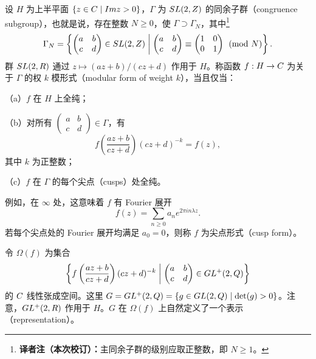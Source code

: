 设 $H$ 为上半平面 $\{z\in C\mid Imz>0\}$，$\Gamma$ 为 $SL(2,Z)$ 的同余子群（congruence subgroup），也就是说，存在整数 $N\geq0$，使 $\Gamma\supset\Gamma_N$，其中\footnote{\textbf{译者注（本次校订）：}主同余子群的级别应取正整数，即 $N\geq1$。}
\[
\Gamma_N=\left\{\begin{pmatrix}a&b\\c&d\end{pmatrix}\in SL(2,Z)\;\middle|\;
\begin{pmatrix}a&b\\c&d\end{pmatrix}\equiv\begin{pmatrix}1&0\\0&1\end{pmatrix}\pmod N\right\}.
\]
群 $SL(2,R)$ 通过 $z\mapsto(az+b)/(cz+d)$ 作用于 $H$。称函数 $f:H\to C$ 为关于 $\Gamma$ 的权 $k$ 模形式（modular form of weight $k$），当且仅当：

（a）$f$ 在 $H$ 上全纯；

（b）对所有 $\begin{pmatrix}a&b\\c&d\end{pmatrix}\in\Gamma$，有
\[
f\left(\frac{az+b}{cz+d}\right)(cz+d)^{-k}=f(z),
\]
其中 $k$ 为正整数；

（c）$f$ 在 $\Gamma$ 的每个尖点（cusps）处全纯。

例如，在 $\infty$ 处，这意味着 $f$ 有 Fourier 展开
\[
f(z)=\sum_{n\geq0}a_ne^{2\pi in\lambda z}.
\]
若每个尖点处的 Fourier 展开均满足 $a_0=0$，则称 $f$ 为尖点形式（cusp form）。

令 $\Omega(f)$ 为集合
\[
\left\{f\left(\frac{az+b}{cz+d}\right)(cz+d)^{-k}\;\middle|\;
\begin{pmatrix}a&b\\c&d\end{pmatrix}\in GL^+(2,Q)\right\}
\]
的 $C$ 线性张成空间。这里 $G=GL^+(2,Q)=\{g\in GL(2,Q)\mid\det(g)>0\}$。注意，$GL^+(2,R)$ 作用于 $H$。$G$ 在 $\Omega(f)$ 上自然定义了一个表示（representation）。

